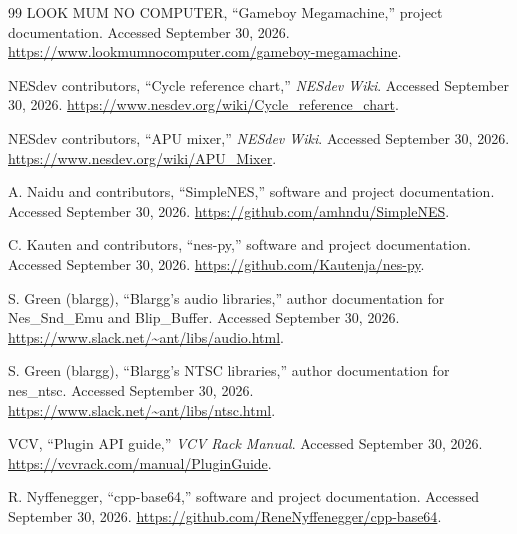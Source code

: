 \documentclass[10pt,letterpaper,twocolumn]{article}
\begin{document}
\begin{thebibliography}{99}
LOOK MUM NO COMPUTER, ``Gameboy Megamachine,'' project documentation.
Accessed September 30, 2026.
\url{https://www.lookmumnocomputer.com/gameboy-megamachine}.

NESdev contributors, ``Cycle reference chart,'' \emph{NESdev Wiki}.
Accessed September 30, 2026.
\url{https://www.nesdev.org/wiki/Cycle_reference_chart}.

NESdev contributors, ``APU mixer,'' \emph{NESdev Wiki}.
Accessed September 30, 2026.
\url{https://www.nesdev.org/wiki/APU_Mixer}.

\newpage
{}
A. Naidu and contributors, ``SimpleNES,'' software and project documentation.
Accessed September 30, 2026.
\url{https://github.com/amhndu/SimpleNES}.

C. Kauten and contributors, ``nes-py,'' software and project documentation.
Accessed September 30, 2026.
\url{https://github.com/Kautenja/nes-py}.

S. Green (blargg), ``Blargg's audio libraries,'' author documentation for
Nes\_Snd\_Emu and Blip\_Buffer. Accessed September 30, 2026.
\url{https://www.slack.net/~ant/libs/audio.html}.

S. Green (blargg), ``Blargg's NTSC libraries,'' author documentation for nes\_ntsc.
Accessed September 30, 2026.
\url{https://www.slack.net/~ant/libs/ntsc.html}.

VCV, ``Plugin API guide,'' \emph{VCV Rack Manual}.
Accessed September 30, 2026.
\url{https://vcvrack.com/manual/PluginGuide}.

R. Nyffenegger, ``cpp-base64,'' software and project documentation.
Accessed September 30, 2026.
\url{https://github.com/ReneNyffenegger/cpp-base64}.
\end{thebibliography}
\end{document}
